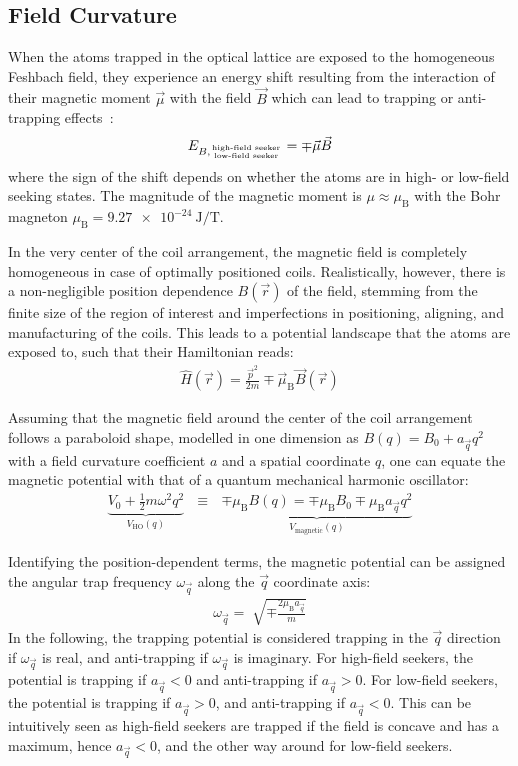 \subsection*{Field Curvature}\label{ch:field_curvature_definition}
When the atoms trapped in the optical lattice are exposed to the homogeneous Feshbach field, they experience an energy shift resulting from the interaction of their magnetic moment $\vec \mu$ with the field $\vec B$ which can lead to trapping or anti-trapping effects~\cite{pritchard_cooling_1983,gehm_properties_2003, hagemann_setup_2020}:
\begin{align}
    E_{B, {\text{high-field seeker} \atop \text{low-field seeker}}} = \mp \vec \mu \vec B
\end{align}
where the sign of the shift depends on whether the atoms are in high- or low-field seeking states. The magnitude of the magnetic moment is $\mu \approx \mu_\text{B}$ with the Bohr magneton $\mu_\text{B} = \SI{9.27e-24}{\joule\per\tesla}$.

In the very center of the coil arrangement, the magnetic field is completely homogeneous in case of optimally positioned coils. Realistically, however, there is a non-negligible position dependence $B(\vec r)$ of the field, stemming from the finite size of the region of interest and imperfections in positioning, aligning, and manufacturing of the coils. This leads to a potential landscape that the atoms are exposed to, such that their Hamiltonian reads:
\begin{align}
    \hat H(\vec r) = \frac{\vec p^2}{2m} \mp \vec \mu_\text{B} \vec B(\vec r)
\end{align}

Assuming that the magnetic field around the center of the coil arrangement follows a paraboloid shape, modelled in one dimension as $B(q) = B_0 + a_{\vec q} q^2$ with a field curvature coefficient $a$ and a spatial coordinate $q$, one can equate the magnetic potential with that of a quantum mechanical harmonic oscillator:
\begin{align}
    \underbrace{V_0 + \frac{1}{2}m\omega^2q^2}_{V_\text{HO}(q)} ~~~\equiv~~~ \underbrace{\mp \mu_\text{B} B(q) = \mp \mu_\text{B} B_0 \mp \mu_\text{B} a_{\vec q} q^2}_{V_\text{magnetic}(q)}
\end{align}

Identifying the position-dependent terms, the magnetic potential can be assigned the angular trap frequency $\omega_{\vec q}$ along the $\vec q$ coordinate axis:
\begin{align}\label{eq:trap_omega_definition}
    \omega_{\vec q} = \sqrt[]{\mp\frac{2 \mu_\text{B} a_{\vec q}}{m}}
\end{align}
In the following, the trapping potential is considered trapping in the ${\vec q}$ direction if $\omega_{\vec q}$ is real, and anti-trapping if $\omega_{\vec q}$ is imaginary. For high-field seekers, the potential is trapping if $a_{\vec q} < 0$ and anti-trapping if $a_{\vec q} > 0$. For low-field seekers, the potential is trapping if $a_{\vec q} > 0$, and anti-trapping if $a_{\vec q} < 0$. This can be intuitively seen as high-field seekers are trapped if the field is concave and has a maximum, hence $a_{\vec q} < 0$, and the other way around for low-field seekers.

